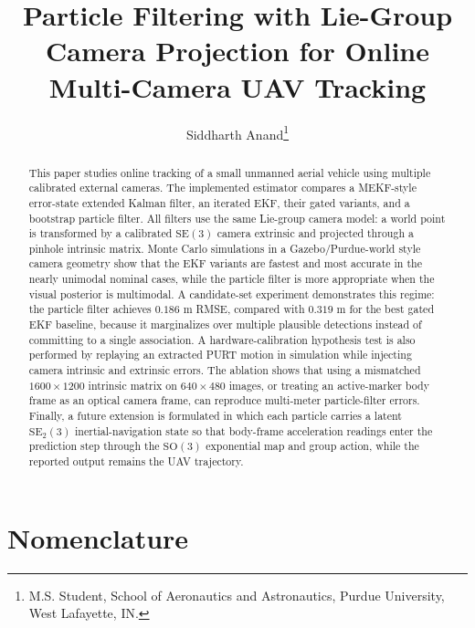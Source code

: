 \documentclass{aiaa-tc}
\title{Particle Filtering with Lie-Group Camera Projection for Online Multi-Camera UAV Tracking}
\author{Siddharth Anand\thanks{M.S. Student, School of Aeronautics and Astronautics, Purdue University, West Lafayette, IN.}}
\newcommand{\SO}{\mathrm{SO}}
\newcommand{\SE}{\mathrm{SE}}
\begin{document}
\maketitle

\begin{abstract}
This paper studies online tracking of a small unmanned aerial vehicle using
multiple calibrated external cameras.  The implemented estimator compares a
MEKF-style error-state extended Kalman filter, an iterated EKF, their gated
variants, and a bootstrap particle filter.  All filters use the same
Lie-group camera model: a world point is transformed by a calibrated
\(\SE(3)\) camera extrinsic and projected through a pinhole intrinsic matrix.
Monte Carlo simulations in a Gazebo/Purdue-world style camera geometry show
that the EKF variants are fastest and most accurate in the nearly unimodal
nominal cases, while the particle filter is more appropriate when the visual
posterior is multimodal.  A candidate-set experiment demonstrates this regime:
the particle filter achieves \(0.186\) m RMSE, compared with \(0.319\) m for
the best gated EKF baseline, because it marginalizes over multiple plausible
detections instead of committing to a single association.  A hardware-calibration
hypothesis test is also performed by replaying an extracted PURT motion in
simulation while injecting camera intrinsic and extrinsic errors.  The ablation
shows that using a mismatched \(1600\times 1200\) intrinsic matrix on
\(640\times 480\) images, or treating an active-marker body frame as an optical
camera frame, can reproduce multi-meter particle-filter errors.  Finally, a
future extension is formulated in which each particle carries a latent
\(\SE_2(3)\) inertial-navigation state so that body-frame acceleration readings
enter the prediction step through the \(\SO(3)\) exponential map and group
action, while the reported output remains the UAV trajectory.
\end{abstract}

\section*{Nomenclature}
\end{document}
